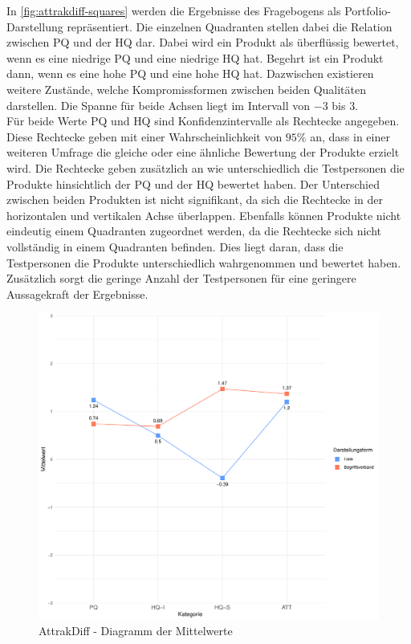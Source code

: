 In \autoref{fig:attrakdiff-squares} werden die Ergebnisse des Fragebogens als Portfolio-Darstellung repräsentiert.
Die einzelnen Quadranten stellen dabei die Relation zwischen \ac{PQ} und der \ac{HQ} dar.
Dabei wird ein Produkt als überflüssig bewertet, wenn es eine niedrige \ac{PQ} und eine niedrige \ac{HQ} hat.
Begehrt ist ein Produkt dann, wenn es eine hohe \ac{PQ} und eine hohe \ac{HQ} hat.
Dazwischen existieren weitere Zustände, welche Kompromissformen zwischen beiden Qualitäten darstellen.
Die Spanne für beide Achsen liegt im Intervall von $-3$ bis $3$. \\

Für beide Werte \ac{PQ} und \ac{HQ} sind Konfidenzintervalle als Rechtecke angegeben.
Diese Rechtecke geben mit einer Wahrscheinlichkeit von $95\%$ an, dass in einer weiteren Umfrage die gleiche oder eine ähnliche Bewertung der Produkte erzielt wird.
Die Rechtecke geben zusätzlich an wie unterschiedlich die Testpersonen die Produkte hinsichtlich der \ac{PQ} und der \ac{HQ} bewertet haben.
Der Unterschied zwischen beiden Produkten ist nicht signifikant, da sich die Rechtecke in der horizontalen und vertikalen Achse überlappen.
Ebenfalls können Produkte nicht eindeutig einem Quadranten zugeordnet werden, da die Rechtecke sich nicht vollständig in einem Quadranten befinden.
Dies liegt daran, dass die Testpersonen die Produkte unterschiedlich wahrgenommen und bewertet haben.
Zusätzlich sorgt die geringe Anzahl der Testpersonen für eine geringere Aussagekraft der Ergebnisse.

\begin{figure}[!ht]
    \centering
    \includegraphics[width=0.7\columnwidth]{figures/attrakdiff-line.pdf}
    \caption{\label{fig:attrakdiff-line}AttrakDiff - Diagramm der Mittelwerte}
\end{figure}


